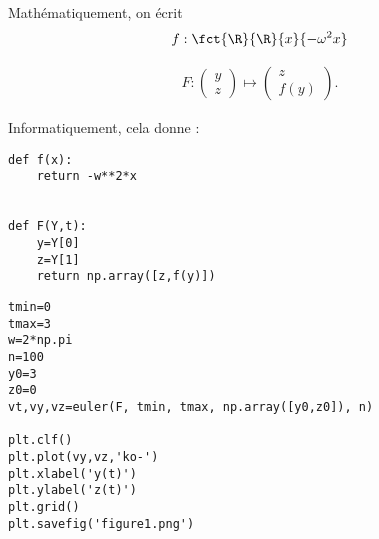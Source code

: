 Mathématiquement, on écrit 
\begin{align*}
f:\fct{\R}{\R}{x}{-\omega^2x}
\end{align*}

\begin{align*}
F : \begin{pmatrix} y \\ z \end{pmatrix} \longmapsto \begin{pmatrix} z \\ f(y) \end{pmatrix}.
\end{align*}

Informatiquement, cela donne :
\begin{lstlisting}
def f(x):
    return -w**2*x
    

def F(Y,t):
    y=Y[0]
    z=Y[1]
    return np.array([z,f(y)])
\end{lstlisting}

\question{}
\begin{lstlisting}
tmin=0
tmax=3
w=2*np.pi
n=100
y0=3
z0=0
vt,vy,vz=euler(F, tmin, tmax, np.array([y0,z0]), n)

plt.clf()
plt.plot(vy,vz,'ko-')
plt.xlabel('y(t)')
plt.ylabel('z(t)')
plt.grid()
plt.savefig('figure1.png')
\end{lstlisting}

%
%
%
%
%
%
%
%
%
%
%
%
%
%
%
%

